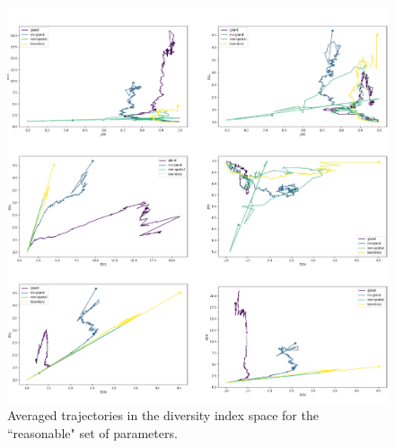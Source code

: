 \begin{figure}[h!]
    \centering
    \includegraphics[width=\textwidth]{Chapter_3/figures/1e04005new.pdf}
    \caption{Averaged trajectories in the diversity index space for the
    ``reasonable" set of parameters.}
    \label{fig:1e04_005new}
\end{figure}
\clearpage

